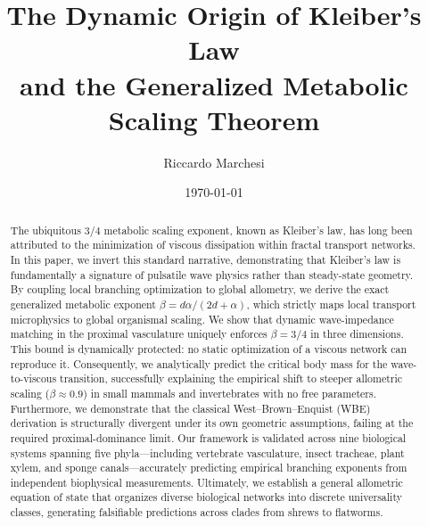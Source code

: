 \documentclass[11pt,a4paper]{article}
\theoremstyle{remark}
\begin{document}



\title{\LARGE\bfseries The Dynamic Origin of Kleiber's Law\\[4pt]
and the Generalized Metabolic Scaling Theorem}
\author{Riccardo Marchesi}
\date{\today}

\maketitle

\begin{abstract}
The ubiquitous $3/4$ metabolic scaling exponent, known as Kleiber's law,
has long been attributed to the minimization of viscous dissipation within
fractal transport networks. In this paper, we invert this standard
narrative, demonstrating that Kleiber's law is fundamentally a signature
of pulsatile wave physics rather than steady-state geometry. By coupling
local branching optimization to global allometry, we derive the exact
generalized metabolic exponent $\beta = d\alpha/(2d+\alpha)$, which
strictly maps local transport microphysics to global organismal scaling.
We show that dynamic wave-impedance matching in the proximal vasculature
uniquely enforces $\beta = 3/4$ in three dimensions. This bound is
dynamically protected: no static optimization of a viscous network can
reproduce it. Consequently, we analytically predict the critical body
mass for the wave-to-viscous transition, successfully explaining the
empirical shift to steeper allometric scaling ($\beta \approx 0.9$) in
small mammals and invertebrates with no free parameters. Furthermore, we
demonstrate that the classical West--Brown--Enquist (WBE) derivation is
structurally divergent under its own geometric assumptions, failing at
the required proximal-dominance limit. Our framework is validated across
nine biological systems spanning five phyla---including vertebrate
vasculature, insect tracheae, plant xylem, and sponge canals---accurately
predicting empirical branching exponents from independent biophysical
measurements. Ultimately, we establish a general allometric equation of
state that organizes diverse biological networks into discrete universality
classes, generating falsifiable predictions across clades from shrews to
flatworms.
\end{abstract}

\end{document}
